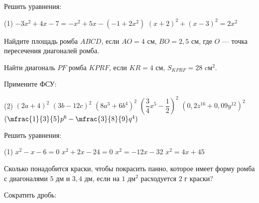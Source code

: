 \begin{class}[number=6]
	\begin{listofex}
		\item Решить уравнения:
		\begin{tasks}(1)
		\task \( -3x^2+4x-7=-x^2+5x-(-1+2x^2) \)
		\task \( (x+2)^2+(x-3)^2=2x^2 \)
		\end{tasks}
		\item Найдите  площадь ромба  \( ABCD \), если \( AO = 4  \) см, \( BO = 2,5 \) см, где  \( O \) --- точка пересечения диагоналей ромба.
		\item Найти диагональ \( PF \) ромба \( KPRF \), если \( KR =4 \) см, \( S_{KPRF}=28 \) cм\( ^2 \).
		\item \exercise{1508}
		\item Примените ФСУ:
		\begin{tasks}(2)
			\task \( (2a+4)^2 \)
			\task \( (3b-12c)^2 \)
			\task \( (8a^3+6b^4)^2 \)
			\task \( (\dfrac{3}{4}x^5-\dfrac{1}{2})^2 \)
			\task \( (0,2z^{16}+0,09y^{12})^2 \)
			\task \( (\mfrac{1}{3}{5}p^6-\mfrac{3}{8}{9}q^4) \)
		\end{tasks}
	\end{listofex}
\end{class}


\begin{homework}[number=3]
	\begin{listofex}
		\item Решить уравнения:
		\begin{tasks}(1)
			\task \( x^2-x-6=0 \)
			\task \( x^2+2x-24=0 \)
			\task \( x^2=-12x-32 \)
			\task \( x^2=4x+45 \)
		\end{tasks}
		\item Сколько понадобится краски, чтобы покрасить панно, которое имеет форму ромба с диагоналями \( 5 \) дм и \( 3,4 \) дм, если на \( 1 \) дм\( ^2 \) расходуется \( 2 \) г краски?
		\item Сократить дробь:
		\begin{itasks}[2]
			\task \exercise{73}
			\task \exercise{76}
		\end{itasks}
	\end{listofex}
\end{homework}

